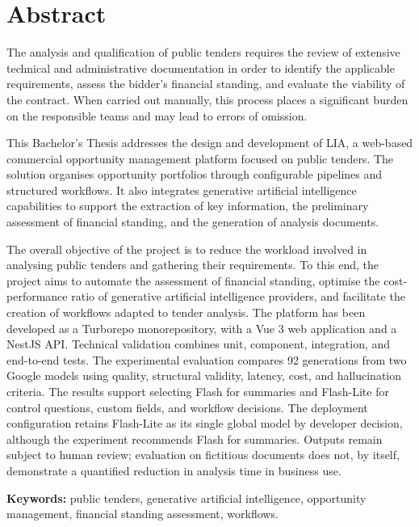 \cleardoublepage
{}
\chapter*{Abstract}
\label{front:abstract}

The analysis and qualification of public tenders requires the review of
extensive technical and administrative documentation in order to identify the
applicable requirements, assess the bidder's financial standing, and evaluate
the viability of the contract. When carried out manually, this process places
a significant burden on the responsible teams and may lead to errors of
omission.

This Bachelor's Thesis addresses the design and development of LIA, a
web-based commercial opportunity management platform focused on public
tenders. The solution organises opportunity portfolios through configurable
pipelines and structured workflows. It also integrates generative artificial
intelligence capabilities to support the extraction of key information, the
preliminary assessment of financial standing, and the generation of analysis
documents.

The overall objective of the project is to reduce the workload involved in
analysing public tenders and gathering their requirements. To this end, the
project aims to automate the assessment of financial standing, optimise the
cost-performance ratio of generative artificial intelligence providers, and
facilitate the creation of workflows adapted to tender analysis. The platform
has been developed as a Turborepo monorepository, with a Vue 3 web application
and a NestJS API. Technical validation combines unit, component, integration,
and end-to-end tests. The experimental evaluation compares 92 generations from
two Google models using quality, structural validity, latency, cost, and
hallucination criteria. The results support selecting Flash for summaries and
Flash-Lite for control questions, custom fields, and workflow decisions. The
deployment configuration retains Flash-Lite as its single global model by
developer decision, although the experiment recommends Flash for summaries. Outputs remain
subject to human review; evaluation on fictitious documents does not, by
itself, demonstrate a quantified reduction in analysis time in business use.

\vspace{0.5cm}
\noindent\textbf{Keywords:} public tenders, generative artificial
intelligence, opportunity management, financial standing assessment,
workflows.

